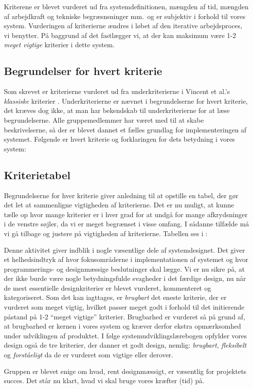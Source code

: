 Kriterene er blevet vurderet ud fra systemdefinitionen, mængden af tid, mængden af arbejdkraft og tekniske begræsnsninger mm.\ og er subjektiv i forhold til vores system. Vurderingen af kriterierne ændres i løbet af den iterative arbejdsproces, vi benytter. På baggrund af det fastlægger vi, at der kan maksimum være 1-2 \emph{meget vigtige} kriterier i dette system.

\subsection{Begrundelser for hvert kriterie}
Som skrevet er kriterierne vurderet ud fra underkriterierne i Vincent et al.'s \emph{klassiske} kriterier \cite[s.~12]{crit}. Underkriterierne er nævnet i begrundelserne for hvert kriterie, det kræves dog ikke, at man har bekendskab til underkriterierne for at læse begrundelserne. Alle gruppemedlemmer har været med til at skabe beskrivelserne, så der er blevet dannet et fælles grundlag for implementeringen af systemet. Følgende er hvert kriterie og forklaringen for dets betydning i vores system:



\subsection{Kriterietabel}
Begrundelserne for hver kriterie giver anledning til at opstille en tabel, der gør det let at sammenligne vigtigheden af kriterierne. Det er nu muligt, at kunne tælle op hvor mange kriterier er i hver grad for at undgå for mange afkrydsninger i de venstre søjler, da vi er meget begrænset i visse omfang. I sådanne tilfælde må vi gå tilbage og justere på vigtigheden af kriterierne. Tabellen ses i :



Denne aktivitet giver indblik i nogle væsentlige dele af systemdesignet. Det giver et helhedsindtryk af hvor fokusområderne i implementationen af systemet og hvor programmerings- og designmæssige beslutninger skal lægge. Vi er nu sikre på, at der ikke burde være nogle betydningsfulde svagheder i det færdige design, nu når de mest essentielle designkriterier er blevet vurderet, kommenteret og kategoriseret. Som det kan iagttages, er \emph{brugbart} det eneste kriterie, der er vurderet som meget vigtig, hvilket passer meget godt i forhold til det initierende påstand på 1-2 ``meget vigtige'' kriterier. Brugbarhed er vurderet så på grund af, at brugbarhed er kernen i vores system og kræver derfor ekstra opmærksomhed under udviklingen af produktet. I følge systemudviklingslærebogen \cite{ooad} opfylder vores design også de tre kriterier, der danner et godt design, nemlig: \emph{brugbart, fleksibelt} og \emph{forståeligt} da de er vurderet som vigtige eller derover.

Gruppen er blevet enige om hvad, rent designmæssigt, er væsentlig for projektets succes. Det står nu klart, hvad vi skal bruge vores kræfter (tid) på.

